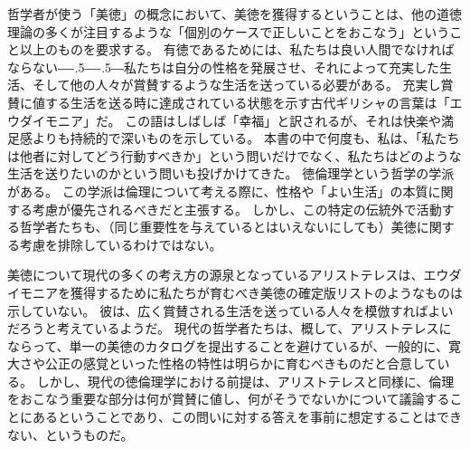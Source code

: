 \documentclass[paper=a4,book,openany]{jlreq}
\def\DDASH{―\kern-.5\zw―\kern-.5\zw―} %
\begin{document}
哲学者が使う「美徳」の概念において、美徳を獲得するということは、他の道徳理論の多くが注目するような「個別のケースで正しいことをおこなう」ということ以上のものを要求する。
有徳であるためには、私たちは良い人間でなければならない{\DDASH}私たちは自分の性格を発展させ、それによって充実した生活、そして他の人々が賞賛するような生活を送っている必要がある。
充実し賞賛に値する生活を送る時に達成されている状態を示す古代ギリシャの言葉は「エウダイモニア」だ。
この語はしばしば「幸福」と訳されるが、それは快楽や満足感よりも持続的で深いものを示している。
本書の中で何度も、私は、「私たちは他者に対してどう行動すべきか」という問いだけでなく、私たちはどのような生活を送りたいのかという問いも投げかけてきた。
徳倫理学という哲学の学派がある。
この学派は倫理について考える際に、性格や「よい生活」の本質に関する考慮が優先されるべきだと主張する。
しかし、この特定の伝統外で活動する哲学者たちも、（同じ重要性を与えているとはいえないにしても）美徳に関する考慮を排除しているわけではない。

美徳について現代の多くの考え方の源泉となっているアリストテレスは、エウダイモニアを獲得するために私たちが育むべき美徳の確定版リストのようなものは示していない。
彼は、広く賞賛される生活を送っている人々を模倣すればよいだろうと考えているようだ。
現代の哲学者たちは、概して、アリストテレスにならって、単一の美徳のカタログを提出することを避けているが、一般的に、寛大さや公正の感覚といった性格の特性は明らかに育むべきものだと合意している。
しかし、現代の徳倫理学における前提は、アリストテレスと同様に、倫理をおこなう重要な部分は何が賞賛に値し、何がそうでないかについて議論することにあるということであり、この問いに対する答えを事前に想定することはできない、というものだ。
\end{document}
